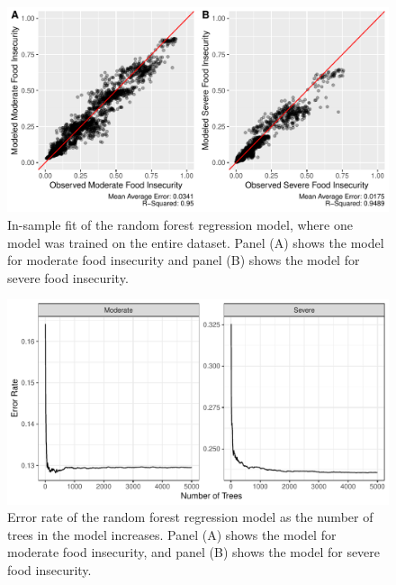 \documentclass{article}
\begin{document}
\begin{figure}[H]
  \centering
  \includegraphics[width=\linewidth]{img/in-sample_rf.pdf}
  \caption{In-sample fit of the random forest regression model, where one model was trained on the entire dataset. Panel (A) shows the model for moderate food insecurity and panel (B) shows the model for severe food insecurity.}
  \label{fig:rf_in-sample}
\end{figure}

\begin{figure}[H]
  \centering
  \includegraphics[width=\linewidth]{img/Error_Over_Training.pdf}
  \caption{Error rate of the random forest regression model as the number of trees in the model increases. Panel (A) shows the model for moderate food insecurity, and panel (B) shows the model for severe food insecurity.}
  \label{fig:mod-error}
\end{figure}
\end{document}
